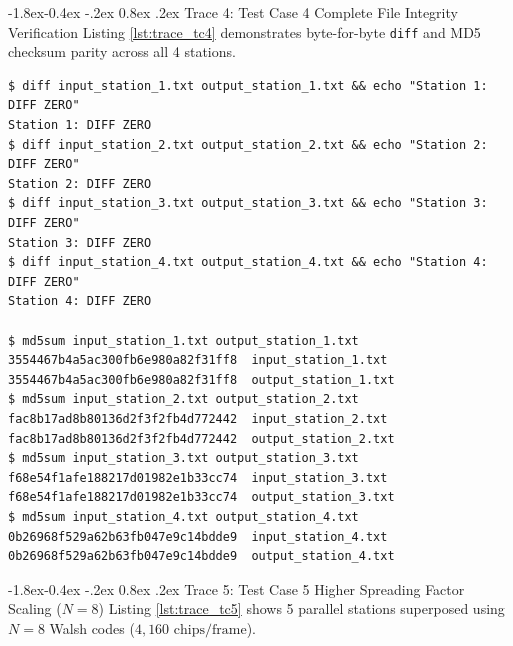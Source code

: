 \documentclass[11pt,a4paper]{article}
\makeatletter
\renewcommand\subsection{\@startsection{subsection}{2}{\z@}%
                                     {-1.8ex\@plus -0.4ex \@minus -.2ex}%
                                     {0.8ex \@plus .2ex}%
                                     {\normalfont\large\bfseries}}
\makeatother
\begin{document}
\subsection{Trace 4: Test Case 4 Complete File Integrity Verification}
Listing \ref{lst:trace_tc4} demonstrates byte-for-byte \texttt{diff} and MD5 checksum parity across all 4 stations.

\begin{lstlisting}[style=tracestyle, caption={Cryptographic hash and diff verification output for Test Case 4.}, label={lst:trace_tc4}]
$ diff input_station_1.txt output_station_1.txt && echo "Station 1: DIFF ZERO"
Station 1: DIFF ZERO
$ diff input_station_2.txt output_station_2.txt && echo "Station 2: DIFF ZERO"
Station 2: DIFF ZERO
$ diff input_station_3.txt output_station_3.txt && echo "Station 3: DIFF ZERO"
Station 3: DIFF ZERO
$ diff input_station_4.txt output_station_4.txt && echo "Station 4: DIFF ZERO"
Station 4: DIFF ZERO

$ md5sum input_station_1.txt output_station_1.txt
3554467b4a5ac300fb6e980a82f31ff8  input_station_1.txt
3554467b4a5ac300fb6e980a82f31ff8  output_station_1.txt
$ md5sum input_station_2.txt output_station_2.txt
fac8b17ad8b80136d2f3f2fb4d772442  input_station_2.txt
fac8b17ad8b80136d2f3f2fb4d772442  output_station_2.txt
$ md5sum input_station_3.txt output_station_3.txt
f68e54f1afe188217d01982e1b33cc74  input_station_3.txt
f68e54f1afe188217d01982e1b33cc74  output_station_3.txt
$ md5sum input_station_4.txt output_station_4.txt
0b26968f529a62b63fb047e9c14bdde9  input_station_4.txt
0b26968f529a62b63fb047e9c14bdde9  output_station_4.txt
\end{lstlisting}

\subsection{Trace 5: Test Case 5 Higher Spreading Factor Scaling \texorpdfstring{($N = 8$)}{(N = 8)}}
Listing \ref{lst:trace_tc5} shows 5 parallel stations superposed using $N = 8$ Walsh codes ($4,160\text{ chips/frame}$).
\end{document}
